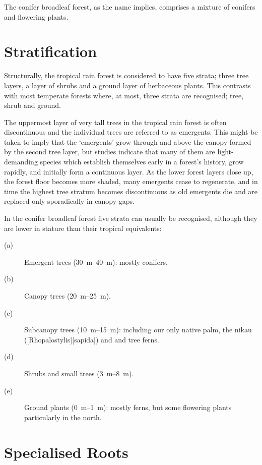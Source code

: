 The conifer broadleaf forest, as the name implies, comprises a mixture of conifers and flowering plants.

\section{Stratification}

Structurally, the tropical rain forest is considered to have five strata; three tree layers, a layer of shrubs and a ground layer of herbaceous plants.
This contrasts with most temperate forests where, at most, three strata are recognised; tree, shrub and ground.

The uppermost layer of very tall trees in the tropical rain forest is often discontinuous and the individual trees are referred to as emergents.
This might be taken to imply that the `emergents' grow through and above the canopy formed by the second tree layer, but studies indicate that many of them are light-demanding species which establish themselves early in a forest's history, grow rapidly, and initially form a continuous layer.
As the lower forest layers close up, the forest floor becomes more shaded, many emergents cease to regenerate, and in time the highest tree stratum becomes discontinuous as old emergents die and are replaced only sporadically in canopy gaps.

In the conifer broadleaf forest five strata can usually be recognised, although they are lower in stature than their tropical equivalents:
\begin{description}
\item[{(a)}]Emergent trees (\SIrange{30}{40}{\metre}): mostly conifers.
\item[{(b)}]Canopy trees (\SIrange{20}{25}{\metre}).
\item[{(c)}]Subcanopy trees (\SIrange{10}{15}{\metre}): including our only native palm, the nikau ([Rhopalostylis][sapida]) and  and  tree ferns.
\item[{(d)}]Shrubs and small trees (\SIrange{3}{8}{\metre}).
\item[{(e)}]Ground plants (\SIrange{0}{1}{\metre}): mostly ferns, but some flowering plants particularly in the north.
\end{description}
\section{Specialised Roots}

